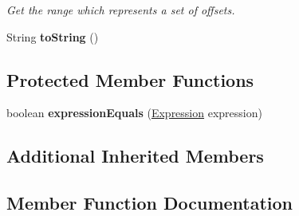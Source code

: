 \begin{DoxyCompactItemize}
\begin{DoxyCompactList}\small\item\em Get the range which represents a set of offsets. \end{DoxyCompactList}\item 
\hypertarget{classedu_1_1udel_1_1cis_1_1vsl_1_1civl_1_1model_1_1common_1_1expression_1_1CommonPointerSetExpression_a469c08adfbf3387249aaaf1b46d4ead8}{}String {\bfseries to\+String} ()\label{classedu_1_1udel_1_1cis_1_1vsl_1_1civl_1_1model_1_1common_1_1expression_1_1CommonPointerSetExpression_a469c08adfbf3387249aaaf1b46d4ead8}

\end{DoxyCompactItemize}
\subsection*{Protected Member Functions}
\begin{DoxyCompactItemize}
\item 
\hypertarget{classedu_1_1udel_1_1cis_1_1vsl_1_1civl_1_1model_1_1common_1_1expression_1_1CommonPointerSetExpression_a73f2b124be11f922458a2881e864bf4d}{}boolean {\bfseries expression\+Equals} (\hyperlink{interfaceedu_1_1udel_1_1cis_1_1vsl_1_1civl_1_1model_1_1IF_1_1expression_1_1Expression}{Expression} expression)\label{classedu_1_1udel_1_1cis_1_1vsl_1_1civl_1_1model_1_1common_1_1expression_1_1CommonPointerSetExpression_a73f2b124be11f922458a2881e864bf4d}

\end{DoxyCompactItemize}
\subsection*{Additional Inherited Members}


\subsection{Member Function Documentation}
\hypertarget{classedu_1_1udel_1_1cis_1_1vsl_1_1civl_1_1model_1_1common_1_1expression_1_1CommonPointerSetExpression_a3db84dff3cc03f762442bb0d34eda957}{}
